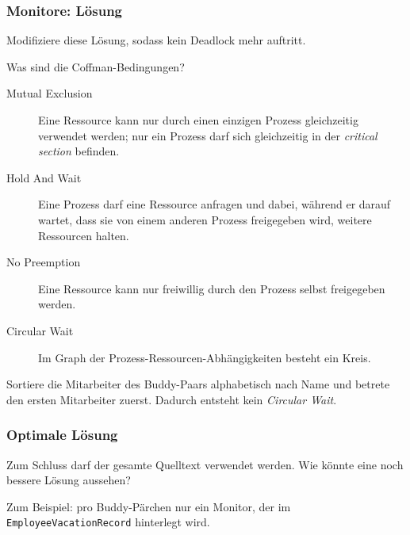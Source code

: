\documentclass{beamer}
\begin{document}
\begin{frame}
  \frametitle{Monitore: Lösung}
  Modifiziere diese Lösung, sodass kein Deadlock mehr auftritt.
  
  Was sind die Coffman-Bedingungen?
  \pause
  \begin{description}
  \item[Mutual Exclusion]
    Eine Ressource kann nur durch einen einzigen Prozess gleichzeitig verwendet werden;
    nur ein Prozess darf sich gleichzeitig in der \emph{critical section} befinden.
  \item[Hold And Wait]
    Eine Prozess darf eine Ressource anfragen und dabei, während er darauf wartet, dass sie von einem anderen Prozess freigegeben wird, weitere Ressourcen halten.
  \item[No Preemption]
    Eine Ressource kann nur freiwillig durch den Prozess selbst freigegeben werden.
  \item[Circular Wait]
    Im Graph der Prozess-Ressourcen-Abhängigkeiten besteht ein Kreis.
  \end{description}
  
  \pause
  Sortiere die Mitarbeiter des Buddy-Paars alphabetisch nach Name
  und betrete den ersten Mitarbeiter zuerst.
  Dadurch entsteht kein \emph{Circular Wait}.
\end{frame}

\begin{frame}
  \frametitle{Optimale Lösung}
  Zum Schluss darf der gesamte Quelltext verwendet werden.
  Wie könnte eine noch bessere Lösung aussehen?
  
  \pause
  Zum Beispiel: pro Buddy-Pärchen nur ein Monitor,
  der im \lstinline{EmployeeVacationRecord} hinterlegt wird.
\end{frame}
\end{document}
